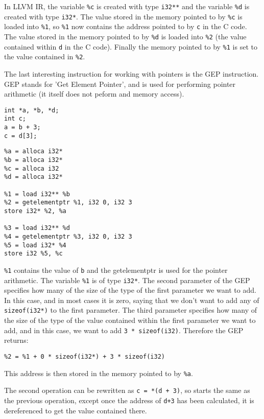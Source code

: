 In LLVM IR, the variable \verb!%c! is created with type \verb!i32**! and the variable \verb!%d! is created with type \verb!i32*!.
The value stored in the memory pointed to by \verb!%c! is loaded into \verb!%1!, so \verb!%1! now contains the address pointed to by \verb!c! in the C code.
The value stored in the memory pointed to by \verb!%d! is loaded into \verb!%2! (the value contained within \verb!d! in the C code).
Finally the memory pointed to by \verb!%1! is set to the value contained in \verb!%2!.

The last interesting instruction for working with pointers is the GEP instruction.
GEP stands for 'Get Element Pointer', and is used for performing pointer arithmetic (it itself does not peform and memory access).

\begin{verbatim}
int *a, *b, *d;
int c;
a = b + 3;
c = d[3];
\end{verbatim}

\begin{verbatim}
%a = alloca i32*
%b = alloca i32*
%c = alloca i32
%d = alloca i32*

%1 = load i32** %b
%2 = getelementptr %1, i32 0, i32 3
store i32* %2, %a

%3 = load i32** %d
%4 = getelementptr %3, i32 0, i32 3
%5 = load i32* %4
store i32 %5, %c
\end{verbatim}

\verb!%1! contains the value of \verb!b! and the getelementptr is used for the pointer arithmetic.
The variable \verb!%1! is of type \verb!i32*!.
The second parameter of the GEP specifies how many of the size of the type of the first parameter we want to add.
In this case, and in most cases it is zero, saying that we don't want to add any of \verb!sizeof(i32*)! to the first parameter.
The third parameter specifies how many of the size of the type of the value contained within the first parameter we want to add, and in this case, we want to add \verb!3 * sizeof(i32)!.
Therefore the GEP returns:

\begin{verbatim}
%2 = %1 + 0 * sizeof(i32*) + 3 * sizeof(i32)
\end{verbatim}

This address is then stored in the memory pointed to by \verb!%a!.

The second operation can be rewritten as \verb!c = *(d + 3)!, so starts the same as the previous operation, except once the address of \verb!d+3! has been calculated, it is dereferenced to get the value contained there.

